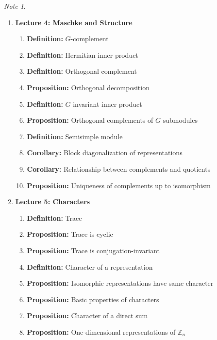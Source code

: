 \documentclass[titlepage]{article}
\theoremstyle{plain}
\theoremstyle{definition}
\theoremstyle{remark}
\newtheorem{note}{Note}
\theoremstyle{exercise-style}
\numberwithin{equation}{section}
\numberwithin{theorem}{section}
\numberwithin{remark}{section}
\begin{document}
\begin{myboxr}
\begin{note}
\begin{enumerate}
            \item \textbf{Lecture 4: Maschke and Structure}
            \begin{enumerate}
                \item \textbf{Definition:} $G$-complement
                \item \textbf{Definition:} Hermitian inner product
                \item \textbf{Definition:} Orthogonal complement
                \item \textbf{Proposition:} Orthogonal decomposition
                \item \textbf{Definition:} $G$-invariant inner product
                \item \textbf{Proposition:} Orthogonal complements of $G$-submodules
                \item \textbf{Definition:} Semisimple module
                \item \textbf{Corollary:} Block diagonalization of representations
                \item \textbf{Corollary:} Relationship between complements and quotients
                \item \textbf{Proposition:} Uniqueness of complements up to isomorphism
            \end{enumerate}
            
            \item \textbf{Lecture 5: Characters}
            \begin{enumerate}
                \item \textbf{Definition:} Trace
                \item \textbf{Proposition:} Trace is cyclic
                \item \textbf{Proposition:} Trace is conjugation-invariant
                \item \textbf{Definition:} Character of a representation
                \item \textbf{Proposition:} Isomorphic representations have same character
                \item \textbf{Proposition:} Basic properties of characters
                \item \textbf{Proposition:} Character of a direct sum
                \item \textbf{Proposition:} One-dimensional representations of $\mathbb{Z}_n$
            \end{enumerate}
            

\end{enumerate}
\end{note}
\end{myboxr}
\end{document}
